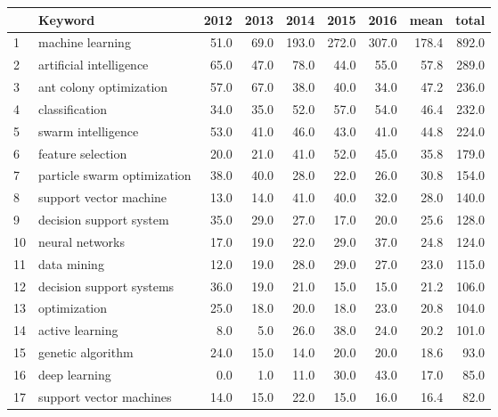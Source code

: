 \begin{tabular}{llrrrrrrr}
\toprule
{} &                          Keyword &  2012 &  2013 &   2014 &   2015 &   2016 &   mean &  total \\
\midrule
1  &                 machine learning &  51.0 &  69.0 &  193.0 &  272.0 &  307.0 &  178.4 &  892.0 \\
2  &          artificial intelligence &  65.0 &  47.0 &   78.0 &   44.0 &   55.0 &   57.8 &  289.0 \\
3  &          ant colony optimization &  57.0 &  67.0 &   38.0 &   40.0 &   34.0 &   47.2 &  236.0 \\
4  &                   classification &  34.0 &  35.0 &   52.0 &   57.0 &   54.0 &   46.4 &  232.0 \\
5  &               swarm intelligence &  53.0 &  41.0 &   46.0 &   43.0 &   41.0 &   44.8 &  224.0 \\
6  &                feature selection &  20.0 &  21.0 &   41.0 &   52.0 &   45.0 &   35.8 &  179.0 \\
7  &      particle swarm optimization &  38.0 &  40.0 &   28.0 &   22.0 &   26.0 &   30.8 &  154.0 \\
8  &           support vector machine &  13.0 &  14.0 &   41.0 &   40.0 &   32.0 &   28.0 &  140.0 \\
9  &          decision support system &  35.0 &  29.0 &   27.0 &   17.0 &   20.0 &   25.6 &  128.0 \\
10 &                  neural networks &  17.0 &  19.0 &   22.0 &   29.0 &   37.0 &   24.8 &  124.0 \\
11 &                      data mining &  12.0 &  19.0 &   28.0 &   29.0 &   27.0 &   23.0 &  115.0 \\
12 &         decision support systems &  36.0 &  19.0 &   21.0 &   15.0 &   15.0 &   21.2 &  106.0 \\
13 &                     optimization &  25.0 &  18.0 &   20.0 &   18.0 &   23.0 &   20.8 &  104.0 \\
14 &                  active learning &   8.0 &   5.0 &   26.0 &   38.0 &   24.0 &   20.2 &  101.0 \\
15 &                genetic algorithm &  24.0 &  15.0 &   14.0 &   20.0 &   20.0 &   18.6 &   93.0 \\
16 &                    deep learning &   0.0 &   1.0 &   11.0 &   30.0 &   43.0 &   17.0 &   85.0 \\
17 &          support vector machines &  14.0 &  15.0 &   22.0 &   15.0 &   16.0 &   16.4 &   82.0 \\

\end{tabular}
